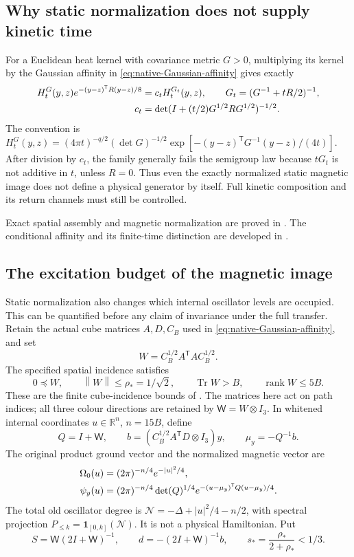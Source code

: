 \documentclass[11pt,oneside,openany]{book}
\theoremstyle{definition}
\theoremstyle{remark}
\newcommand{\R}{\mathbb R}
\newcommand{\one}{\mathbf1}
\newcommand{\Tr}{\operatorname{Tr}}
\newcommand{\rank}{\operatorname{rank}}
\newcommand{\norm}[1]{\left\lVert#1\right\rVert}
\newcommand{\src}[2]{\cite[#2]{#1}}
\newcommand{\sourcebasis}[1]{\par\smallskip\noindent #1\par}
\begin{document}
\subsection{Why static normalization does not supply kinetic time}
For a Euclidean heat kernel with covariance metric $G>0$, multiplying
its kernel by the Gaussian affinity in
\cref{eq:native-Gaussian-affinity} gives exactly
\begin{align}
 H_t^G(y,z)e^{-(y-z)^{\mathsf T}R(y-z)/8}
       &=c_t H_t^{G_t}(y,z),\qquad G_t=(G^{-1}+tR/2)^{-1},\notag\\
 c_t&=\det(I+(t/2)G^{1/2}RG^{1/2})^{-1/2}.
 \label{eq:affinity-modified-heat}
\end{align}
The convention is
$H_t^G(y,z)=(4\pi t)^{-q/2}(\det G)^{-1/2}
\exp[-(y-z)^{\mathsf T}G^{-1}(y-z)/(4t)]$.
After division by $c_t$, the family generally fails the semigroup
law because $tG_t$ is not additive in $t$, unless $R=0$.
Thus even the exactly normalized static magnetic image does not
define a physical generator by itself. Full kinetic composition and
its return channels must still be controlled.
\sourcebasis{Exact spatial assembly and magnetic normalization are
proved in \src{F15}{V98--V100}. The conditional affinity and its
finite-time distinction are developed in \src{F16}{V1}.}

\subsection{The excitation budget of the magnetic image}
\label{sec:native-excitation-budget}
Static normalization also changes which internal oscillator levels are
occupied. This can be quantified before any claim of invariance under
the full transfer. Retain the actual cube matrices $A,D,C_B$ used in
\cref{eq:native-Gaussian-affinity}, and set
\[
 W=C_B^{1/2}A^{\mathsf T}AC_B^{1/2}.
\]
The specified spatial incidence satisfies
\begin{equation}
 0\preceq W,\qquad \norm W\le\rho_*=1/\sqrt2,\qquad
 \Tr W>B,\qquad \rank W\le5B.
 \label{eq:magnetic-incidence-stock}
\end{equation}
These are the finite cube-incidence bounds of \src{F15}{V99--V100}.
The matrices here act on path indices; all three colour directions
are retained by $\mathsf W=W\otimes I_3$. In whitened internal
coordinates $u\in\R^{n}$, $n=15B$, define
\[
 Q=I+\mathsf W,\qquad
 b=(C_B^{1/2}A^{\mathsf T}D\otimes I_3)y,\qquad \mu_y=-Q^{-1}b.
\]
The original product ground vector and the normalized magnetic vector
are
\begin{align}
 \Omega_0(u)&=(2\pi)^{-n/4}e^{-|u|^2/4},\notag\\
 \psi_y(u)&=(2\pi)^{-n/4}\det(Q)^{1/4}
                   e^{-(u-\mu_y)^{\mathsf T}Q(u-\mu_y)/4}.
 \label{eq:magnetic-whitened-state}
\end{align}
The total old oscillator degree is
$\mathcal N=-\Delta+|u|^2/4-n/2$, with spectral projection
$P_{\le k}=\one_{[0,k]}(\mathcal N)$. It is not a physical
Hamiltonian. Put
\[
 S=\mathsf W(2I+\mathsf W)^{-1},\qquad
 d=-(2I+\mathsf W)^{-1}b,\qquad
 s_*=\frac{\rho_*}{2+\rho_*}<1/3.
\]
\end{document}

